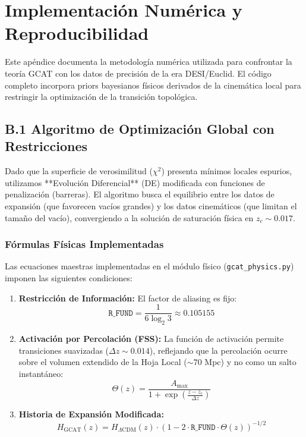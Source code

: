 \documentclass[12pt, a4paper]{article}
\theoremstyle{plain}
\theoremstyle{definition}
\begin{document}
\section{Implementación Numérica y Reproducibilidad}
\label{app:codigo}

Este apéndice documenta la metodología numérica utilizada para confrontar la teoría GCAT con los datos de precisión de la era DESI/Euclid. El código completo incorpora priors bayesianos físicos derivados de la cinemática local para restringir la optimización de la transición topológica.

\subsection{B.1 Algoritmo de Optimización Global con Restricciones}

Dado que la superficie de verosimilitud ($\chi^2$) presenta mínimos locales espurios, utilizamos **Evolución Diferencial** (DE) modificada con funciones de penalización (barreras). El algoritmo busca el equilibrio entre los datos de expansión (que favorecen vacíos grandes) y los datos cinemáticos (que limitan el tamaño del vacío), convergiendo a la solución de saturación física en $z_c \sim 0.017$.

\subsubsection{Fórmulas Físicas Implementadas}

Las ecuaciones maestras implementadas en el módulo físico (\texttt{gcat\_physics.py}) imponen las siguientes condiciones:

\begin{enumerate}
    \item \textbf{Restricción de Información:} El factor de aliasing es fijo:
    \[
    \texttt{R\_FUND} = \frac{1}{6 \log_2 3} \approx 0.105155
    \]
    
    \item \textbf{Activación por Percolación (FSS):} La función de activación permite transiciones suavizadas ($\Delta z \sim 0.014$), reflejando que la percolación ocurre sobre el volumen extendido de la Hoja Local ($\sim 70$ Mpc) y no como un salto instantáneo:
    \[
    \Theta(z) = \frac{A_{\max}}{1 + \exp\left(\frac{z - z_c}{\Delta z}\right)}
    \]
    
    \item \textbf{Historia de Expansión Modificada:}
    \[
    H_{\text{GCAT}}(z) = H_{\Lambda\text{CDM}}(z) \cdot \left(1 - 2 \cdot \texttt{R\_FUND} \cdot \Theta(z)\right)^{-1/2}
    \]
\end{enumerate}
\end{document}
